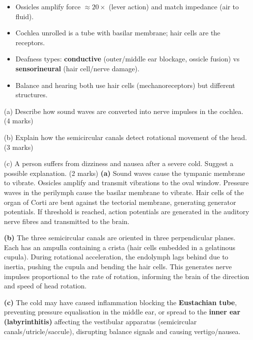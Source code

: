 \documentclass[11pt]{article}
\begin{document}
\begin{attention}
\begin{itemize}
\item Ossicles amplify force $\approx 20\times$ (lever action) and match impedance (air to fluid).
\item Cochlea unrolled is a tube with basilar membrane; hair cells are the receptors.
\item Deafness types: \textbf{conductive} (outer/middle ear blockage, ossicle fusion) vs \textbf{sensorineural} (hair cell/nerve damage).
\item Balance and hearing both use hair cells (mechanoreceptors) but different structures.
\end{itemize}
\end{attention}

\begin{exoresolu}
(a) Describe how sound waves are converted into nerve impulses in the cochlea. \hfill (4 marks)\par
(b) Explain how the semicircular canals detect rotational movement of the head. \hfill (3 marks)\par
(c) A person suffers from dizziness and nausea after a severe cold. Suggest a possible explanation. \hfill (2 marks)
\tcblower
\textbf{(a)} Sound waves cause the tympanic membrane to vibrate. Ossicles amplify and transmit vibrations to the oval window. Pressure waves in the perilymph cause the basilar membrane to vibrate. Hair cells of the organ of Corti are bent against the tectorial membrane, generating generator potentials. If threshold is reached, action potentials are generated in the auditory nerve fibres and transmitted to the brain.\par
\textbf{(b)} The three semicircular canals are oriented in three perpendicular planes. Each has an ampulla containing a crista (hair cells embedded in a gelatinous cupula). During rotational acceleration, the endolymph lags behind due to inertia, pushing the cupula and bending the hair cells. This generates nerve impulses proportional to the rate of rotation, informing the brain of the direction and speed of head rotation.\par
\textbf{(c)} The cold may have caused inflammation blocking the \textbf{Eustachian tube}, preventing pressure equalisation in the middle ear, or spread to the \textbf{inner ear (labyrinthitis)} affecting the vestibular apparatus (semicircular canals/utricle/saccule), disrupting balance signals and causing vertigo/nausea.
\end{exoresolu}
\end{document}

